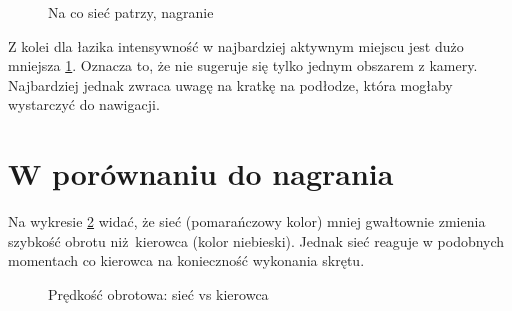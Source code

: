 \begin{figure}
  \centering
  \caption{Na co sieć patrzy, nagranie}
  \label{real_act}
\end{figure}

Z kolei dla łazika intensywność w najbardziej aktywnym miejscu jest dużo mniejsza \ref{real_act}.
Oznacza to, że nie sugeruje się tylko jednym obszarem z kamery. Najbardziej jednak 
zwraca uwagę na kratkę na podłodze, która mogłaby wystarczyć do nawigacji.

\section{W porównaniu do nagrania}
Na wykresie \ref{plot_ang} widać, że sieć (pomarańczowy kolor) mniej gwałtownie 
zmienia szybkość obrotu niż kierowca (kolor niebieski). Jednak sieć reaguje w podobnych momentach co kierowca na konieczność wykonania skrętu.

\begin{figure}
  \centering
  \caption{Prędkość obrotowa: sieć vs kierowca}
  \label{plot_ang}
\end{figure}

